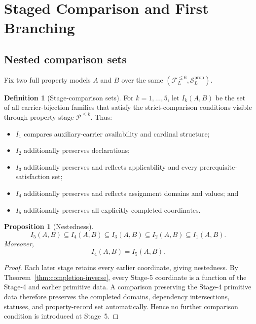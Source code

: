 \documentclass[11pt]{article}
\newcommand{\FVI}{\mathcal F_{L}^{\le 6}}
\newcommand{\Sprop}{\mathcal S_{L}^{\mathrm{prop}}}
\newtheorem{proposition}[theorem]{Proposition}
\theoremstyle{definition}
\newtheorem{definition}[theorem]{Definition}
\theoremstyle{remark}
\begin{document}
\section{Staged Comparison and First Branching}
\label{sec:branching}

\subsection{Nested comparison sets}

Fix two full property models \(A\) and \(B\) over the same \((\FVI,\Sprop)\).

\begin{definition}[Stage-comparison sets]
For \(k=1,\ldots,5\), let \(I_k(A,B)\) be the set of all carrier-bijection families that satisfy the strict-comparison conditions visible through property stage \(\mathcal P^{\le k}\).
Thus:
\begin{itemize}
\item \(I_1\) compares auxiliary-carrier availability and cardinal structure;
\item \(I_2\) additionally preserves declarations;
\item \(I_3\) additionally preserves and reflects applicability and every prerequisite-satisfaction set;
\item \(I_4\) additionally preserves and reflects assignment domains and values; and
\item \(I_5\) additionally preserves all explicitly completed coordinates.
\end{itemize}
\end{definition}

\begin{proposition}[Nestedness]
\[
I_5(A,B)\subseteq I_4(A,B)\subseteq I_3(A,B)\subseteq I_2(A,B)\subseteq I_1(A,B).
\]
Moreover,
\[
I_4(A,B)=I_5(A,B).
\]
\end{proposition}

\begin{proof}
Each later stage retains every earlier coordinate, giving nestedness.
By Theorem~\ref{thm:completion-inverse}, every Stage-5 coordinate is a function of the Stage-4 and earlier primitive data.
A comparison preserving the Stage-4 primitive data therefore preserves the completed domains, dependency intersections, statuses, and property-record set automatically.
Hence no further comparison condition is introduced at Stage~5.
\end{proof}
\end{document}
